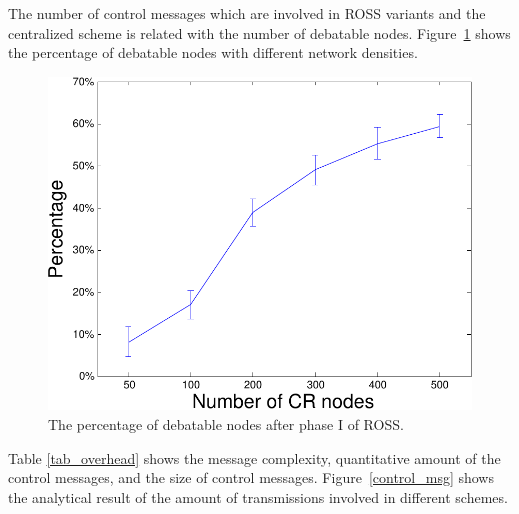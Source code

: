 \documentclass[times]{ettauth}
\theoremstyle{mytheoremstyle}
\theoremstyle{mytheoremstyle}
\theoremstyle{mytheoremstyle}
\begin{document}
The number of control messages which are involved in ROSS variants and the centralized scheme is related with the number of debatable nodes.
Figure~\ref{percentage_overlapping_node} shows the percentage of debatable nodes with different network densities.
\begin{figure}[ht!]
  \centering
  \includegraphics[width=0.6\linewidth]{percentage_overlapping_node.pdf}
  \caption{The percentage of debatable nodes after phase I of ROSS.}\label{percentage_overlapping_node}
\end{figure}
%
%
%
%
Table \ref{tab_overhead} shows the message complexity, quantitative amount of the control messages, and the size of control messages.
Figure~\ref{control_msg} shows the analytical result of the amount of transmissions involved in different schemes.
\end{document}
